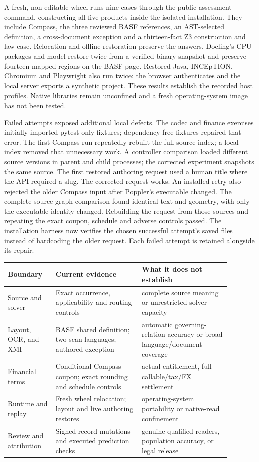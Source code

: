 A fresh, non-editable wheel runs nine cases through the public assessment
command, constructing all five products inside the isolated installation.
They include Compass, the three reviewed BASF references, an AST-selected
definition, a cross-document exception and a thirteen-fact Z3 construction and
law case.  Relocation and offline
restoration preserve the answers.  Docling's CPU packages and model restore
twice from a verified binary snapshot and preserve fourteen mapped regions on
the BASF page.  Restored Java, INCEpTION, Chromium and Playwright also run twice:
the browser authenticates and the local server exports a synthetic project.
These results establish the recorded host profiles.  Native libraries remain
unconfined and a fresh operating-system image has not been tested.

Failed attempts exposed additional local defects.  The codec and finance
exercises initially imported pytest-only fixtures; dependency-free fixtures
repaired that error.  The first Compass run repeatedly rebuilt the full source
index; a local index removed that unnecessary work.  A controller comparison
loaded different source versions in parent and child processes; the corrected
experiment snapshots the same source.  The first restored authoring request
used a human title where the API required a slug.  The corrected request works.
An installed retry also rejected the older Compass input after Poppler's
executable changed.  The complete source-graph comparison found identical text
and geometry, with only the executable identity changed.  Rebuilding the
request from those sources and repeating the exact coupon, schedule and adverse
controls passed.  The installation harness now verifies the chosen successful
attempt's saved files instead of hardcoding the older request.
Each failed attempt is retained alongside its repair.

\begin{center}
\small
\begin{tabular}{>{\raggedright\arraybackslash}p{0.19\linewidth}>{\raggedright\arraybackslash}p{0.34\linewidth}>{\raggedright\arraybackslash}p{0.35\linewidth}}
\textbf{Boundary} & \textbf{Current evidence} & \textbf{What it does not establish}\\
\hline
Source and solver & Exact occurrence, applicability and routing controls & complete source meaning or unrestricted solver capacity\\
Layout, OCR, and XMI & BASF shared definition; two scan languages; authored exception & automatic governing-relation accuracy or broad language/document coverage\\
Financial terms & Conditional Compass coupon; exact rounding and schedule controls & actual entitlement, full callable/tax/FX settlement\\
Runtime and replay & Fresh wheel relocation; layout and live authoring restores & operating-system portability or native-read confinement\\
Review and attribution & Signed-record mutations and executed prediction checks & genuine qualified readers, population accuracy, or legal release\\
\end{tabular}
\end{center}

